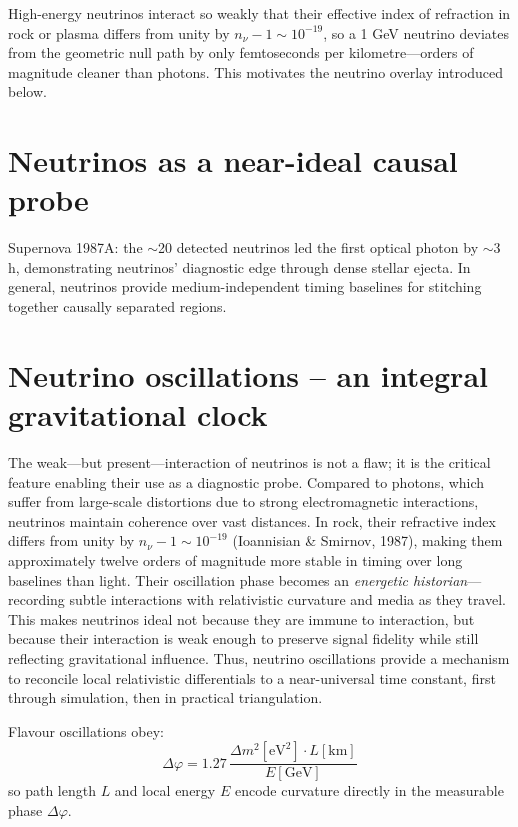 \documentclass[12pt]{article}
\begin{document}
High-energy neutrinos interact so weakly that their effective index of refraction in rock or plasma differs from unity by $n_\nu - 1 \sim 10^{-19}$, so a 1 GeV neutrino deviates from the geometric null path by only femtoseconds per kilometre—orders of magnitude cleaner than photons. This motivates the neutrino overlay introduced below.

\section{Neutrinos as a near-ideal causal probe}
Supernova 1987A: the $\sim$20 detected neutrinos led the first optical photon by $\sim$3 h, demonstrating neutrinos’ diagnostic edge through dense stellar ejecta. In general, neutrinos provide medium-independent timing baselines for stitching together causally separated regions.

\section{Neutrino oscillations – an integral gravitational clock}
The weak—but present—interaction of neutrinos is not a flaw; it is the critical feature enabling their use as a diagnostic probe. Compared to photons, which suffer from large-scale distortions due to strong electromagnetic interactions, neutrinos maintain coherence over vast distances. In rock, their refractive index differs from unity by $n_\nu - 1 \sim 10^{-19}$ (Ioannisian \& Smirnov, 1987), making them approximately twelve orders of magnitude more stable in timing over long baselines than light. Their oscillation phase becomes an \textit{energetic historian}—recording subtle interactions with relativistic curvature and media as they travel. This makes neutrinos ideal not because they are immune to interaction, but because their interaction is weak enough to preserve signal fidelity while still reflecting gravitational influence. Thus, neutrino oscillations provide a mechanism to reconcile local relativistic differentials to a near-universal time constant, first through simulation, then in practical triangulation.

Flavour oscillations obey:
\[
\Delta \varphi = 1.27\,\frac{\Delta m^2 [\mathrm{eV}^2] \cdot L [\mathrm{km}]}{E [\mathrm{GeV}]}
\]
so path length $L$ and local energy $E$ encode curvature directly in the measurable phase $\Delta \varphi$.

\end{document}
